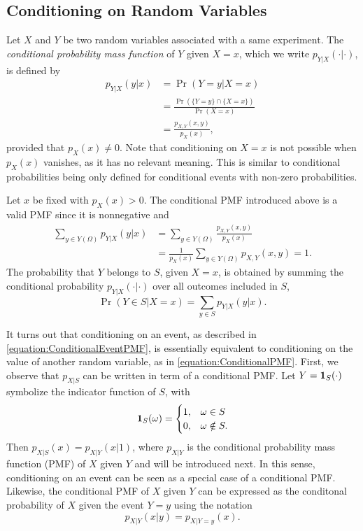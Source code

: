 \subsection{Conditioning on Random Variables}

Let $X$ and $Y$ be two random variables associated with a same experiment.
The \emph{conditional probability mass function} of $Y$ given $X = x$, which we write $p_{Y|X} (\cdot | \cdot)$, is defined by 
\begin{equation} \label{equation:ConditionalPMF}
\begin{split}
p_{Y|X} (y|x) &= \Pr ( Y = y | X = x) \\
&= \frac{\Pr (\{Y = y\} \cap \{ X = x \})}{\Pr (X = x)} \\
&= \frac{ p_{X,Y} (x,y) }{p_X(x)},
\end{split}
\end{equation}
provided that $p_X (x) \neq 0$.
Note that conditioning on $X = x$ is not possible when $p_X (x)$ vanishes, as it has no relevant meaning.
This is similar to conditional probabilities being only defined for conditional events with non-zero probabilities.

Let $x$ be fixed with $p_X (x) > 0$.
The conditional PMF introduced above is a valid PMF since it is nonnegative and
\begin{equation*}
\begin{split}
\sum_{y \in Y(\Omega)} p_{Y|X} (y|x)
&= \sum_{y \in Y(\Omega)} \frac{p_{X,Y} (x,y)}{p_X (x)} \\
&= \frac{1}{p_X (x)} \sum_{y \in Y(\Omega)} p_{X,Y} (x,y) = 1.
\end{split}
\end{equation*}
The probability that $Y$ belongs to $S$, given $X = x$, is obtained by summing the conditional probability $p_{Y|X} (\cdot | \cdot)$ over all outcomes included in $S$,
\begin{equation*}
\Pr (Y \in S | X = x) = \sum_{y \in S} p_{Y|X} (y | x) .
\end{equation*}

It turns out that conditioning on an event, as described in \eqref{equation:ConditionalEventPMF}, is essentially equivalent to conditioning on the value of another random variable, as in \eqref{equation:ConditionalPMF}.
First, we observe that $p_{X|S}$ can be written in term of a conditional PMF.
Let $Y = \mathbf{1}_S (\cdot)$ symbolize the indicator function of $S$, with
\begin{equation*}
\mathbf{1}_S (\omega) = \begin{cases} 1, & \omega \in S\\
0, & \omega \notin S . \end{cases}
\end{equation*}
Then $p_{X|S} (x) = p_{X|Y} (x | 1)$, where $p_{X|Y}$ is the conditional probability mass function (PMF) of $X$ given $Y$ and will be introduced next.
In this sense, conditioning on an event can be seen as a special case of a conditional PMF.
Likewise, the conditional PMF of $X$ given $Y$ can be expressed as the conditonal probability of $X$ given the event $Y=y$ using the notation
\[ p_{X|Y} (x|y) = p_{X|Y=y} (x). \]



